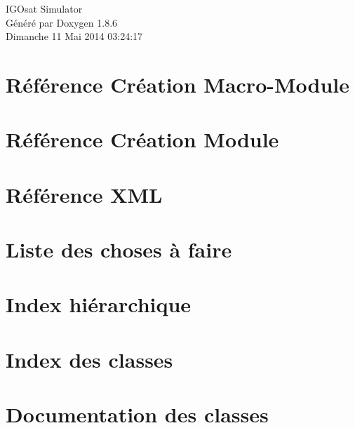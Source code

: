 \documentclass[twoside]{book}
\newcommand{\clearemptydoublepage}{%
  \newpage{\pagestyle{empty}\cleardoublepage}%
}
\begin{document}
\hypersetup{pageanchor=false}
\begin{titlepage}
\vspace*{7cm}
\begin{center}%
{\Large I\-G\-Osat Simulator }\\
\vspace*{1cm}
{\large Généré par Doxygen 1.8.6}\\
\vspace*{0.5cm}
{\small Dimanche 11 Mai 2014 03:24:17}\\
\end{center}
\end{titlepage}
\clearemptydoublepage
\tableofcontents
\clearemptydoublepage
{}
\hypersetup{pageanchor=true}

\chapter{Référence Création Macro-\/\-Module}
\label{docMacroModule}
\hypertarget{docMacroModule}{}

\chapter{Référence Création Module}
\label{docModule}
\hypertarget{docModule}{}

\chapter{Référence X\-M\-L}
\label{xmlRef}
\hypertarget{xmlRef}{}

\chapter{Liste des choses à faire}
\label{todo}
\hypertarget{todo}{}

\chapter{Index hiérarchique}

\chapter{Index des classes}

\chapter{Documentation des classes}




















\newpage
{}
{}
\printindex
\end{document}
